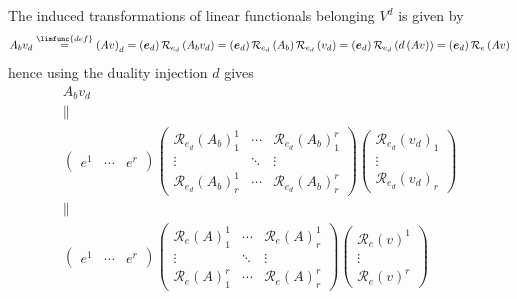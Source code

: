 \documentclass[aps,preprint]{revtex4}
\begin{document}
The induced transformations of linear functionals belonging $V^{d}$ is given
by 
\begin{equation}
A_{b}v_{d}\overset{\limfunc{def}}{=}\left( Av\right) _{d}=\left( \boldsymbol{%
e}_{d}\right) \mathcal{R}_{e_{d}}\left( A_{b}v_{d}\right) =\left( 
\boldsymbol{e}_{d}\right) \mathcal{R}_{e_{d}}\left( A_{b}\right) \mathcal{R}%
_{e_{d}}\left( v_{d}\right) =\left( \boldsymbol{e}_{d}\right) \mathcal{R}%
_{e_{d}}\left( d\left( Av\right) \right) =\left( \boldsymbol{e}_{d}\right) 
\mathcal{R}_{e}\left( Av\right)
\end{equation}%
hence using the duality injection $d$ gives 
\begin{gather}
A_{b}v_{d} \\
\parallel \\
\left( 
\begin{array}{ccc}
e^{1} & \cdots & e^{r}%
\end{array}%
\right) \left( 
\begin{array}{ccc}
\mathcal{R}_{e_{d}}\left( A_{b}\right) _{1}^{1} & \cdots & \mathcal{R}%
_{e_{d}}\left( A_{b}\right) _{1}^{r} \\ 
\vdots & \ddots & \vdots \\ 
\mathcal{R}_{e_{d}}\left( A_{b}\right) _{r}^{1} & \cdots & \mathcal{R}%
_{e_{d}}\left( A_{b}\right) _{r}^{r}%
\end{array}%
\right) \left( 
\begin{array}{c}
\mathcal{R}_{e_{d}}\left( v_{d}\right) _{1} \\ 
\vdots \\ 
\mathcal{R}_{e_{d}}\left( v_{d}\right) _{r}%
\end{array}%
\right) \\
\parallel \\
\left( 
\begin{array}{ccc}
e^{1} & \cdots & e^{r}%
\end{array}%
\right) \left( 
\begin{array}{ccc}
\mathcal{R}_{e}\left( A\right) _{1}^{1} & \cdots & \mathcal{R}_{e}\left(
A\right) _{r}^{1} \\ 
\vdots & \ddots & \vdots \\ 
\mathcal{R}_{e}\left( A\right) _{1}^{r} & \cdots & \mathcal{R}_{e}\left(
A\right) _{r}^{r}%
\end{array}%
\right) \left( 
\begin{array}{c}
\mathcal{R}_{e}\left( v\right) ^{1} \\ 
\vdots \\ 
\mathcal{R}_{e}\left( v\right) ^{r}%
\end{array}%
\right)
\end{gather}%
\end{document}
